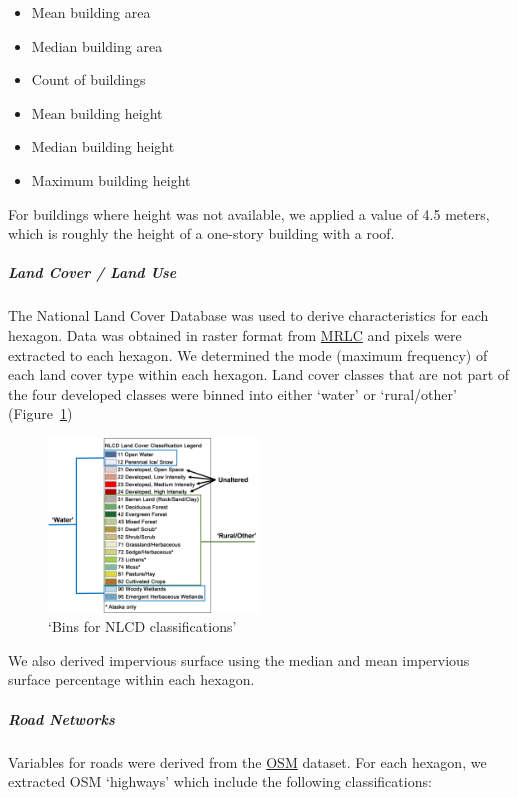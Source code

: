 \documentclass[
  letterpaper,
  DIV=11,
  numbers=noendperiod]{scrartcl}
\let\oldsubparagraph\subparagraph
\renewcommand{\subparagraph}[1]{\oldsubparagraph{#1}\mbox{}}
\providecommand{\tightlist}{%
  \setlength{\itemsep}{0pt}\setlength{\parskip}{0pt}}\usepackage{longtable,booktabs,array}
\begin{document}
\begin{itemize}
\tightlist
\item
  Mean building area
\item
  Median building area
\item
  Count of buildings
\item
  Mean building height
\item
  Median building height
\item
  Maximum building height
\end{itemize}

For buildings where height was not available, we applied a value of 4.5
meters, which is roughly the height of a one-story building with a roof.

\subparagraph{Land Cover / Land Use}\label{land-cover-land-use}

The National Land Cover Database was used to derive characteristics for
each hexagon. Data was obtained in raster format from
\href{https://www.mrlc.gov/}{MRLC} and pixels were extracted to each
hexagon. We determined the mode (maximum frequency) of each land cover
type within each hexagon. Land cover classes that are not part of the
four developed classes were binned into either `water' or `rural/other'
(Figure~\ref{fig-NLCD})

\begin{figure}

\includegraphics[width=0.5\textwidth,height=\textheight]{img/NLCD_Class.png}

\caption{\label{fig-NLCD}`Bins for NLCD classifications'}

\end{figure}%

We also derived impervious surface using the median and mean impervious
surface percentage within each hexagon.

\subparagraph{Road Networks}\label{road-networks}

Variables for roads were derived from the
\href{https://www.openstreetmap.org/}{OSM} dataset. For each hexagon, we
extracted OSM `highways' which include the following classifications:
\end{document}
